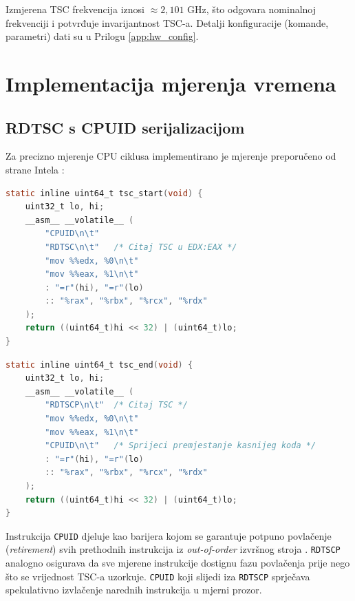 Izmjerena TSC frekvencija iznosi $\approx 2{,}101$ GHz, što odgovara nominalnoj frekvenciji i potvrđuje invarijantnost TSC-a. Detalji konfiguracije (komande, parametri) dati su u Prilogu \ref{app:hw_config}.

\section{Implementacija mjerenja vremena}
\label{sec:timing_impl}

\subsection{RDTSC s CPUID serijalizacijom}

Za precizno mjerenje CPU ciklusa implementirano je mjerenje preporučeno od strane Intela \cite{intel_bench}:

\begin{lstlisting}[language=C, caption={Serijalizovano čitanje TSC -- početak mjerenja}, label=lst:tsc_start]
static inline uint64_t tsc_start(void) {
    uint32_t lo, hi;
    __asm__ __volatile__ (
        "CPUID\n\t"   
        "RDTSC\n\t"   /* Citaj TSC u EDX:EAX */
        "mov %%edx, %0\n\t"
        "mov %%eax, %1\n\t"
        : "=r"(hi), "=r"(lo)
        :: "%rax", "%rbx", "%rcx", "%rdx"
    );
    return ((uint64_t)hi << 32) | (uint64_t)lo;
}
\end{lstlisting}

\begin{lstlisting}[language=C, caption={Serijalizovano čitanje TSC -- kraj mjerenja}, label=lst:tsc_end]
static inline uint64_t tsc_end(void) {
    uint32_t lo, hi;
    __asm__ __volatile__ (
        "RDTSCP\n\t"  /* Citaj TSC */
        "mov %%edx, %0\n\t"
        "mov %%eax, %1\n\t"
        "CPUID\n\t"   /* Sprijeci premjestanje kasnijeg koda */
        : "=r"(hi), "=r"(lo)
        :: "%rax", "%rbx", "%rcx", "%rdx"
    );
    return ((uint64_t)hi << 32) | (uint64_t)lo;
}
\end{lstlisting}

Instrukcija \texttt{CPUID} djeluje kao barijera kojom se garantuje potpuno povlačenje (\textit{retirement}) svih prethodnih instrukcija iz \textit{out-of-order} izvršnog stroja \cite{intel_bench}. \texttt{RDTSCP} analogno osigurava da sve mjerene instrukcije dostignu fazu povlačenja prije nego što se vrijednost TSC-a uzorkuje. \texttt{CPUID} koji slijedi iza \texttt{RDTSCP} sprječava spekulativno izvlačenje narednih instrukcija u mjerni prozor.

